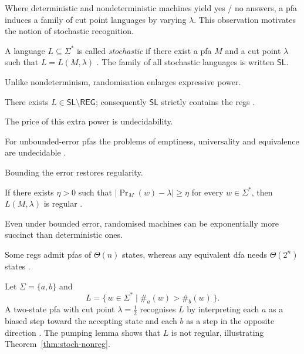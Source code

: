 Where deterministic and nondeterministic machines yield yes / no
answers, a \gls{pfa} induces a family of cut point languages by varying
$\lambda$.  This observation motivates the notion of stochastic
recognition.

\begin{definition}\label{def:stoch}
A language $L\subseteq\Sigma^{\ast}$ is called \emph{stochastic} if
there exist a \gls{pfa} $M$ and a cut point $\lambda$ such that
$L=L(M,\lambda)$ \cite{rabin1963probabilistic}.  The family of all stochastic
languages is written $\mathsf{SL}$.
\end{definition}

Unlike nondeterminism, randomisation enlarges expressive power.

\begin{theorem}\label{thm:stoch-nonreg}
There exists $L\in\mathsf{SL}\setminus\mathsf{REG}$; consequently
$\mathsf{SL}$ strictly contains the \glspl{reg}
\cite{rabin1963probabilistic}.
\end{theorem}

The price of this extra power is undecidability.

\begin{proposition}\label{prop:pfa-undec}
For unbounded-error \glspl{pfa} the problems of emptiness,
universality and equivalence are undecidable \cite{paz2014introduction}.
\end{proposition}

Bounding the error restores regularity.

\begin{theorem}\label{thm:pfa-bounded}
If there exists $\eta>0$ such that
$\lvert\Pr_{M}(w)-\lambda\rvert\ge\eta$ for every
$w\in\Sigma^{\ast}$, then $L(M,\lambda)$ is regular
\cite{paz2014introduction}.
\end{theorem}

Even under bounded error, randomised machines can be exponentially more
succinct than deterministic ones.

\begin{observation}\label{obs:pfa-states}
Some \glspl{reg} admit \glspl{pfa} of $\Theta(n)$ states, whereas
any equivalent \gls{dfa} needs $\Theta(2^{n})$ states
\cite{paz2014introduction}.
\end{observation}

\begin{example}\label{ex:pfa-majority}
Let $\Sigma=\{a,b\}$ and
\[
  L=\{\,w\in\Sigma^{\ast}\mid\#_{a}(w)>\#_{b}(w)\,\}.
\]
A two-state \gls{pfa} with cut point $\lambda=\tfrac12$ recognises $L$
by interpreting each $a$ as a biased step toward the accepting state and
each $b$ as a step in the opposite direction
\cite{rabin1963probabilistic}.  The pumping lemma shows that $L$ is not regular,
illustrating Theorem~\ref{thm:stoch-nonreg}.
\end{example}

